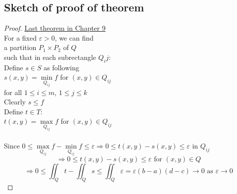 \documentclass[12pt]{article}
\begin{document}
\subsection*{Sketch of proof of theorem}
  \begin{proof}
    \underline{Last theorem in Chapter 9} \\
    For a fixed $\varepsilon>0$, we can find \\
    a partition $P_1 \times P_2$ of $Q$ \\
    such that in each subrectangle $Q_ij$: \\
    Define $s\in S$ as following \\
    $s(x,y)=\min\limits_{Q_{ij}}f$ for $(x,y)\in Q_{ij}$ \\
    for all $1\leq i\leq m$, $1\leq j\leq k$ \\
    Clearly $s\leq f$ \\
    Define $t\in T$: \\
    $t(x,y)=\max\limits_{Q_{ij}}f$ for $(x,y)\in Q_{ij}$ \\
     \\
    Since $0\leq\max\limits_{Q_{ij}}f-\min\limits_{Q_{ij}}f\leq\varepsilon\Rightarrow 0\leq t(x,y)-s(x,y)\leq \varepsilon$ in $Q_{ij}$ \\
    \[ \Rightarrow 0\leq t(x,y)-s(x,y)\leq\varepsilon\text{ for }(x,y)\in Q \]
    \[ \Rightarrow 0\leq\iint_Qt-\iint_Qs\leq\iint_Q\varepsilon=\varepsilon(b-a)(d-c)\rightarrow 0\text{ as }\varepsilon\rightarrow 0 \]
  \end{proof}
\end{document}
